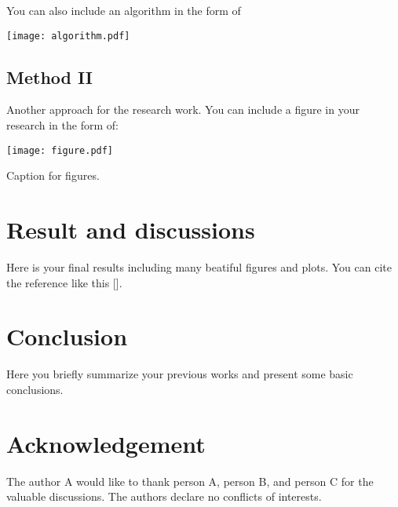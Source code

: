 \documentclass[preprint,12pt]{elsarticle}
\begin{document}
You can also include an algorithm in the form of
\begin{center}
    \texttt{[image: algorithm.pdf]} \\ 
\end{center}
\subsection{Method II}

Another approach for the research work. You can include a figure in your research in the form of:

\begin{center}
    \texttt{[image: figure.pdf]} \\ 
\end{center}
\begin{center}
 Caption for figures.
\end{center}




\section{Result and discussions}
Here is your final results including many beatiful figures and plots. You can cite the reference like this [\citealp{01}].






\section{Conclusion}
Here you briefly summarize your previous works and present some basic conclusions.



\section*{Acknowledgement}
The author A would like to thank person A, person B, and person C for the valuable discussions. The authors declare no conflicts of interests.
% 



\end{document}
